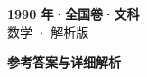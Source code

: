 \documentclass[zihao=-4, a4paper]{ctexart}
\begin{document}
\begin{center}
  {\Large\bfseries 1990 年·全国卷·文科}\\[4pt]
  {\large 数学 · 解析版}
\end{center}
\medskip
{}

\clearpage
{}
\begin{center}{\Large\bfseries 参考答案与详细解析}\end{center}
\medskip

\end{document}
